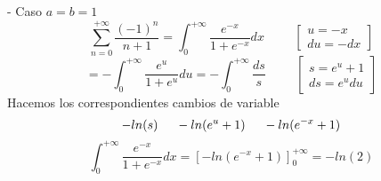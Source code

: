 - Caso $a=b=1$
\[ \sum_{n=0}^{+\infty} \frac{(-1)^n}{n+1} 
 = \int_0^{+\infty} \frac{e^{-x}}{1+e^{-x}} dx \hspace{1cm}
	\begin{bmatrix}
	u  = -x \\
	du = -dx
	\end{bmatrix}
\]
\[ = - \int_0^{+\infty} \frac{e^u}{1+e^u} du 
   = - \int_0^{+\infty} \frac{ds}{s} \hspace{1cm}
	\begin{bmatrix}
	s = e^u + 1 \\
	ds = e^u du
	\end{bmatrix}
\]
Hacemos los correspondientes cambios de variable
\[ -ln(s) \hspace{0.5cm} -ln(e^u+1) \hspace{0.5cm} -ln(e^{-x}+1)
\]
\[ \int_0^{+\infty} \frac{e^{-x}}{1+e^{-x}} dx 
 = \left[ -ln(e^{-x}+1) \right]_0^{+\infty} = -ln(2)
\]
